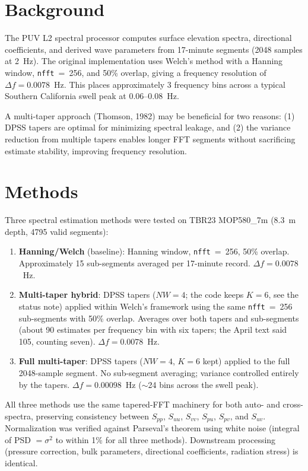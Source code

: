 \documentclass[11pt]{article}
\begin{document}
\section{Background}

The PUV L2 spectral processor computes surface elevation spectra,
directional coefficients, and derived wave parameters from 17-minute
segments (2048 samples at 2~Hz). The original implementation uses
Welch's method with a Hanning window, \texttt{nfft}~=~256, and 50\%
overlap, giving a frequency resolution of $\Delta f = 0.0078$~Hz.
This places approximately 3 frequency bins across a typical Southern
California swell peak at 0.06--0.08~Hz.

A multi-taper approach (Thomson, 1982) may be beneficial for
two reasons: (1) DPSS tapers are optimal for minimizing spectral
leakage, and (2) the variance reduction from multiple tapers enables
longer FFT segments without sacrificing estimate stability, improving
frequency resolution.

\section{Methods}

Three spectral estimation methods were tested on TBR23 MOP580\_7m
(8.3~m depth, 4795 valid segments):

\begin{enumerate}
  \item \textbf{Hanning/Welch} (baseline): Hanning window,
    \texttt{nfft}~=~256, 50\% overlap. Approximately 15 sub-segments
    averaged per 17-minute record. $\Delta f = 0.0078$~Hz.

  \item \textbf{Multi-taper hybrid}: DPSS tapers ($NW = 4$; the code keeps
    $K = 6$, see the status note) applied within Welch's framework using the
    same \texttt{nfft}~=~256 sub-segments with 50\% overlap. Averages over
    both tapers and sub-segments (about 90 estimates per frequency bin with
    six tapers; the April text said 105, counting seven). $\Delta f = 0.0078$~Hz.

  \item \textbf{Full multi-taper}: DPSS tapers ($NW = 4$, $K = 6$ kept)
    applied to the full 2048-sample segment. No sub-segment averaging;
    variance controlled entirely by the tapers.
    $\Delta f = 0.00098$~Hz ($\sim$24 bins across the swell peak).
\end{enumerate}

All three methods use the same tapered-FFT machinery for both auto-
and cross-spectra, preserving consistency between $S_{pp}$, $S_{uu}$,
$S_{vv}$, $S_{pu}$, $S_{pv}$, and $S_{uv}$. Normalization was
verified against Parseval's theorem using white noise (integral of PSD
$= \sigma^2$ to within 1\% for all three methods). Downstream
processing (pressure correction, bulk parameters, directional
coefficients, radiation stress) is identical.
\end{document}
